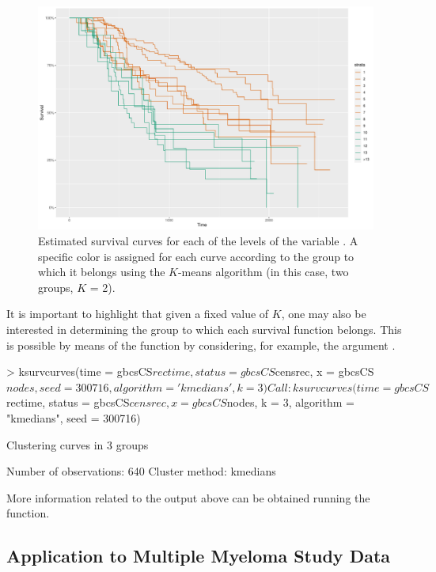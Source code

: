 \begin{figure}[htbp]
\includegraphics[width = 14cm]{breast_cancer_kmeans.pdf}
\caption{\label{noramv:gbcskmeans}
Estimated survival curves for each of the levels of the variable . A specific color is assigned for each curve according to the group to which it belongs using the $K$-means algorithm (in this case, two groups, $K$ = 2).}
\end{figure}



It is important to highlight that given a fixed value of $K$, one may also be interested in determining the group to which each survival function belongs. This is possible by means of the  function by considering, for example, the argument .


\begin{example}
> ksurvcurves(time = gbcsCS$rectime, status = gbcsCS$censrec, x = gbcsCS$nodes, 
		    seed = 300716, algorithm = 'kmedians', k = 3)

Call:  
ksurvcurves(time = gbcsCS$rectime, status = gbcsCS$censrec, x = gbcsCS$nodes, 
    k = 3, algorithm = "kmedians", seed = 300716)

Clustering curves in 3 groups

Number of observations:  640
Cluster method:  kmedians
\end{example}

More information related to  the output above can be obtained running the  function. 


 
\subsection{Application to Multiple Myeloma Study Data}



